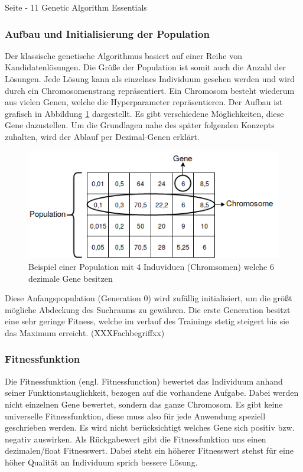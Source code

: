 Seite - 11 Genetic Algorithm Essentials
\fi 

\subsubsection{Aufbau und Initialisierung  der Population}
Der klassische genetische Algorithmus basiert auf einer Reihe von Kandidatenlösungen. Die Größe der Population ist somit auch die Anzahl der Lösungen. Jede Lösung kann als einzelnes Individuum gesehen werden und wird durch ein Chromosomenstrang repräsentiert. Ein Chromosom besteht wiederum aus vielen Genen, welche die Hyperparameter repräsentieren. Der Aufbau ist grafisch in Abbildung \ref{fig:population} dargestellt. Es gibt verschiedene Möglichkeiten, diese Gene dazustellen. Um die Grundlagen nahe des später folgenden Konzepts zuhalten, wird der Ablauf per Dezimal-Genen erklärt.



\noindent%
\begin{figure}[H]
  \centering  
  \includegraphics[scale=0.7]{img/population.png}
  \caption{Beispiel einer Population mit 4 Induviduen (Chromsomen) welche 6 dezimale Gene besitzen}
  \label{fig:population}
\end{figure}

Diese Anfangspopulation (Generation 0) wird zufällig initialisiert, um die größt mögliche Abdeckung des Suchraums zu gewähren. Die erste Generation besitzt eine sehr geringe Fitness, welche im verlauf des Trainings stetig steigert bis sie das Maximum erreicht. (XXXFachbegriffxx)


\subsubsection{Fitnessfunktion}
Die Fitnessfunktion (engl. Fitnessfunction) bewertet das Individuum anhand seiner Funktionstauglichkeit, bezogen auf die vorhandene Aufgabe. Dabei werden nicht einzelnen Gene bewertet, sondern das ganze Chromosom. Es gibt keine universelle Fitnessfunktion, diese muss also für jede Anwendung speziell geschrieben werden. Es wird nicht berücksichtigt welches Gene sich positiv bzw. negativ auswirken. Als Rückgabewert gibt die Fitnessfunktion uns einen dezimalen/float Fitnesswert. Dabei steht ein höherer Fitnesswert stehst für eine höher Qualität an Individuum sprich bessere Lösung.

